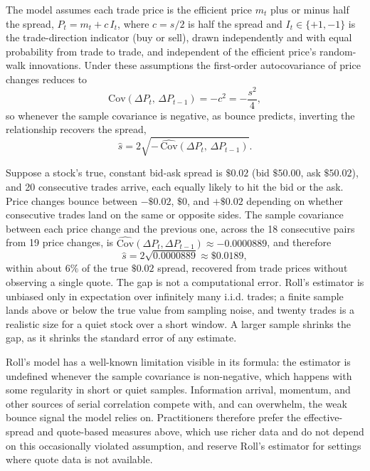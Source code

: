 \documentclass[../ai_in_finance]{subfiles}
\begin{document}
The model assumes each trade price is the efficient price $m_t$ plus or minus half the spread, $P_t = m_t + c\,I_t$, where $c=s/2$ is half the spread and $I_t\in\{+1,-1\}$ is the trade-direction indicator (buy or sell), drawn independently and with equal probability from trade to trade, and independent of the efficient price's random-walk innovations. Under these assumptions the first-order autocovariance of price changes reduces to
\begin{equation}
\text{Cov}(\Delta P_t,\, \Delta P_{t-1}) = -c^2 = -\frac{s^2}{4},
\label{eq:hft-roll-cov}
\end{equation}
so whenever the sample covariance is negative, as bounce predicts, inverting the relationship recovers the spread,
\begin{equation}
\hat s = 2\sqrt{-\,\widehat{\text{Cov}}(\Delta P_t,\, \Delta P_{t-1})}.
\label{eq:hft-roll-estimator}
\end{equation}

Suppose a stock's true, constant bid-ask spread is $\$0.02$ (bid $\$50.00$, ask $\$50.02$), and 20 consecutive trades arrive, each equally likely to hit the bid or the ask. Price changes bounce between $-\$0.02$, $\$0$, and $+\$0.02$ depending on whether consecutive trades land on the same or opposite sides. The sample covariance between each price change and the previous one, across the 18 consecutive pairs from 19 price changes, is $\widehat{\text{Cov}}(\Delta P_t,\Delta P_{t-1}) \approx -0.0000889$, and therefore
\begin{equation*}
\hat s = 2\sqrt{0.0000889} \approx \$0.0189,
\end{equation*}
within about $6\%$ of the true $\$0.02$ spread, recovered from trade prices without observing a single quote. The gap is not a computational error. Roll's estimator is unbiased only in expectation over infinitely many i.i.d. trades; a finite sample lands above or below the true value from sampling noise, and twenty trades is a realistic size for a quiet stock over a short window. A larger sample shrinks the gap, as it shrinks the standard error of any estimate.

Roll's model has a well-known limitation visible in its formula: the estimator is undefined whenever the sample covariance is non-negative, which happens with some regularity in short or quiet samples. Information arrival, momentum, and other sources of serial correlation compete with, and can overwhelm, the weak bounce signal the model relies on. Practitioners therefore prefer the effective-spread and quote-based measures above, which use richer data and do not depend on this occasionally violated assumption, and reserve Roll's estimator for settings where quote data is not available.
\end{document}
